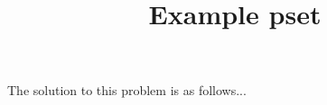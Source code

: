 \documentclass{scrartcl}
\title{Example pset}
\begin{document}
\maketitle

\newpsetproblem
\begin{solution}
	The solution to this problem is as follows...
\end{solution}

\end{document}
